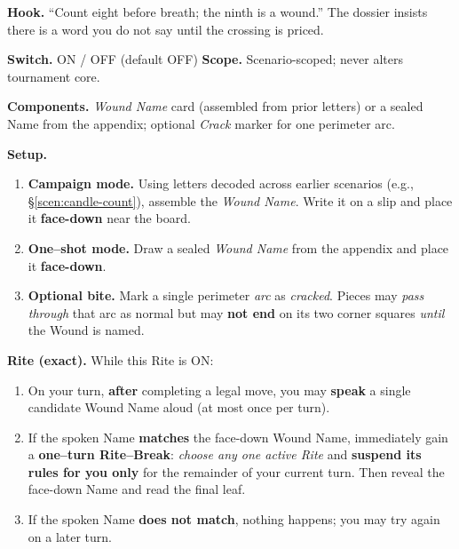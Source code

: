 \documentclass[11pt]{article}
\numberwithin{equation}{section} %
\theoremstyle{plain} %
\theoremstyle{definition} %
\theoremstyle{remark} %
\begin{document}
\noindent\textbf{Hook.} “Count eight before breath; the ninth is a wound.” The dossier insists there is a word you do not say until the crossing is priced.

\medskip
\noindent\textbf{Switch.} \textsc{ON / OFF} (default \textsc{OFF}) \hfill \textbf{Scope.} Scenario-scoped; never alters tournament core.

\medskip
\noindent\textbf{Components.} \emph{Wound Name} card (assembled from prior letters) or a sealed Name from the appendix; optional \emph{Crack} marker for one perimeter arc.

\medskip
\noindent\textbf{Setup.}
\begin{enumerate}\setlength\itemsep{0.2em}
  \item \textbf{Campaign mode.} Using letters decoded across earlier scenarios (e.g., \S\ref{scen:candle-count}), assemble the \emph{Wound Name}. Write it on a slip and place it \textbf{face-down} near the board.
  \item \textbf{One–shot mode.} Draw a sealed \emph{Wound Name} from the appendix and place it \textbf{face-down}.
  \item \textbf{Optional bite.} Mark a single perimeter \emph{arc} as \emph{cracked}. Pieces may \emph{pass through} that arc as normal but may \textbf{not end} on its two corner squares \textit{until} the Wound is named.
\end{enumerate}

\medskip
\noindent\textbf{Rite (exact).} While this Rite is \textsc{ON}:
\begin{enumerate}\setlength\itemsep{0.2em}
  \item On your turn, \textbf{after} completing a legal move, you may \textbf{speak} a single candidate Wound Name aloud (at most once per turn).
  \item If the spoken Name \textbf{matches} the face-down Wound Name, immediately gain a \textbf{one–turn Rite–Break}: \emph{choose any one active Rite} and \textbf{suspend its rules for you only} for the remainder of your current turn. Then reveal the face-down Name and read the final leaf.
  \item If the spoken Name \textbf{does not match}, nothing happens; you may try again on a later turn.
\end{enumerate}
\end{document}
